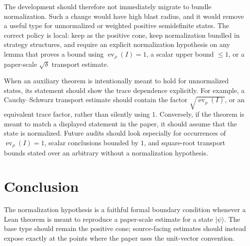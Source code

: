 \documentclass[11pt]{article}
\newcommand{\ev}{\operatorname{ev}}
\begin{document}
The development should therefore not immediately migrate  to
bundle normalization. Such a change would have high blast radius, and it would
remove a useful type for unnormalized or weighted positive semidefinite states.
The correct policy is local: keep  as the positive cone, keep
normalization bundled in strategy structures, and require an explicit
normalization hypothesis on any lemma that proves a bound using
$\ev_\rho(I)=1$, a scalar upper bound $\le 1$, or a paper-scale
$\sqrt\delta$ transport estimate.

When an auxiliary theorem is intentionally meant to hold for unnormalized
states, its statement should show the trace dependence explicitly. For example,
a Cauchy--Schwarz transport estimate should contain the factor
$\sqrt{\ev_\rho(I)}$, or an equivalent trace factor, rather than silently using
$1$. Conversely, if the theorem is meant to match a displayed statement in
the paper, it should assume that the state is normalized. Future audits should
look especially for occurrences of $\ev_\rho(I)=1$, scalar conclusions bounded
by $1$, and square-root transport bounds stated over an arbitrary
 without a normalization hypothesis.

\section{Conclusion}

The normalization hypothesis is a faithful formal boundary condition whenever a
Lean theorem is meant to reproduce a paper-scale estimate for a state
$|\psi\rangle$.  The base  type should remain the positive
cone; source-facing estimates should instead expose
 exactly at the points where the paper uses
the unit-vector convention.



\end{document}
